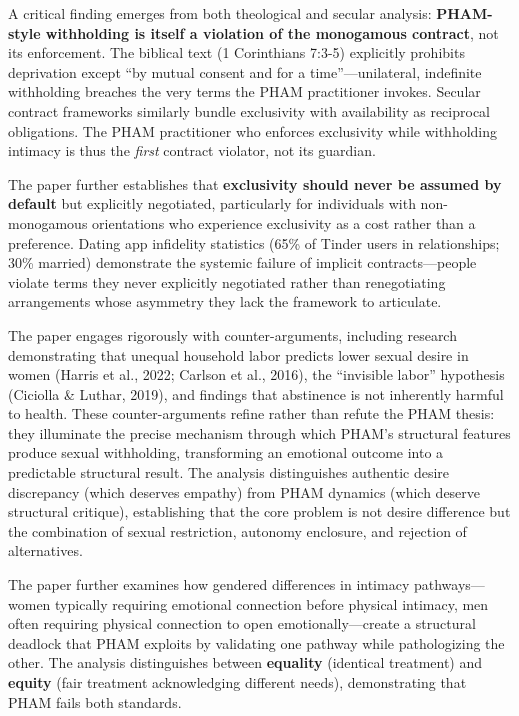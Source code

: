 \documentclass[12pt, letterpaper]{article}
\begin{document}
A critical finding emerges from both theological and secular analysis: \textbf{PHAM-style withholding is itself a violation of the monogamous contract}, not its enforcement. The biblical text (1 Corinthians 7:3-5) explicitly prohibits deprivation except ``by mutual consent and for a time''---unilateral, indefinite withholding breaches the very terms the PHAM practitioner invokes. Secular contract frameworks similarly bundle exclusivity with availability as reciprocal obligations. The PHAM practitioner who enforces exclusivity while withholding intimacy is thus the \textit{first} contract violator, not its guardian.

The paper further establishes that \textbf{exclusivity should never be assumed by default} but explicitly negotiated, particularly for individuals with non-monogamous orientations who experience exclusivity as a cost rather than a preference. Dating app infidelity statistics (65\% of Tinder users in relationships; 30\% married) demonstrate the systemic failure of implicit contracts---people violate terms they never explicitly negotiated rather than renegotiating arrangements whose asymmetry they lack the framework to articulate.

The paper engages rigorously with counter-arguments, including research demonstrating that unequal household labor predicts lower sexual desire in women (Harris et al., 2022; Carlson et al., 2016), the ``invisible labor'' hypothesis (Ciciolla \& Luthar, 2019), and findings that abstinence is not inherently harmful to health. These counter-arguments refine rather than refute the PHAM thesis: they illuminate the precise mechanism through which PHAM's structural features produce sexual withholding, transforming an emotional outcome into a predictable structural result. The analysis distinguishes authentic desire discrepancy (which deserves empathy) from PHAM dynamics (which deserve structural critique), establishing that the core problem is not desire difference but the combination of sexual restriction, autonomy enclosure, and rejection of alternatives.

The paper further examines how gendered differences in intimacy pathways---women typically requiring emotional connection before physical intimacy, men often requiring physical connection to open emotionally---create a structural deadlock that PHAM exploits by validating one pathway while pathologizing the other. The analysis distinguishes between \textbf{equality} (identical treatment) and \textbf{equity} (fair treatment acknowledging different needs), demonstrating that PHAM fails both standards.
\end{document}
